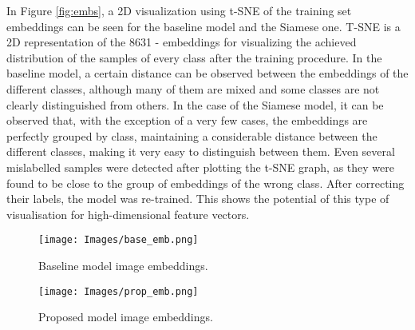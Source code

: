 In Figure \ref{fig:embs}, a 2D visualization using t-SNE of the training set embeddings can be seen for the baseline model and the Siamese one. T-SNE \cite{van2008visualizing} is a 2D representation of the 8631 - embeddings for visualizing the achieved distribution of the samples of every class after the training procedure. In the  baseline model, a certain distance can be observed between the embeddings of the different classes, although many of them are mixed and some classes are not clearly distinguished from others. In the case of the Siamese model, it can be observed that, with the exception of a very few cases, the embeddings are perfectly grouped by class, maintaining a considerable distance between the different classes, making it very easy to distinguish between them. Even several mislabelled samples were detected after plotting the t-SNE graph, as they were found to be close to the group of embeddings of the wrong class. After correcting their labels, the model was re-trained. This shows the potential of this type of visualisation for high-dimensional feature vectors.

\begin{figure*}[h!]
        \centering
        \begin{subfigure}[b]{0.49\textwidth}
       	    \centering
            \texttt{[image: Images/base\_emb.png]}
             \caption[Baseline model image embeddings.]
            {\small Baseline model image embeddings.}   
            \label{fig:base_embs}
        \end{subfigure}
        \hfill
        \begin{subfigure}[b]{0.49\textwidth}  
            \centering
            \texttt{[image: Images/prop\_emb.png]}
             \caption[Proposed model image embeddings.]
            {\small Proposed model image embeddings.}   
            \label{fig:prop_embs}
        \end{subfigure}
        \caption[t-SNE representation of the image embeddings.]
        {\small t-SNE representation of the image embeddings.}    
        \label{fig:embs}
    \end{figure*}

